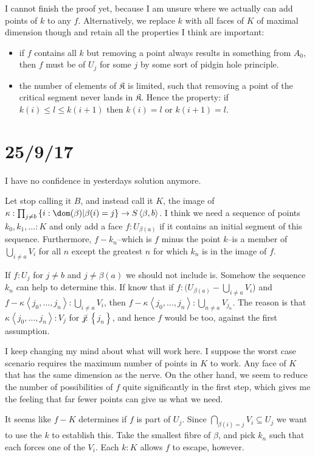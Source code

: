 \documentclass{tac}
\newcommand\set[1]{\left\{#1\right\}}
\newcommand\of{:}
\newcommand\tuplet[1]{\left\langle #1 \right\rangle}
\begin{document}
I cannot finish the proof yet, because I am unsure where we actually can add points of $k$ to any $f$. Alternatively, we replace $k$ with all faces of $K$ of maximal dimension though and retain all the properties I think are important:
\begin{itemize}
\item if $f$ contains all $k$ but removing a point always results in something from $A_0$, then $f$ must be of $U_j$ for some $j$ by some sort of pidgin hole principle.
\item the number of elements of $\mathfrak K$ is limited, such that removing a point of the critical segment never lands in $\mathfrak K$. Hence the property: if $k(i)\leq l \leq k(i+1)$ then $k(i) = l$ or $k(i+1) = l$.
\end{itemize}

\section{25/9/17}
I have no confidence in yesterdays solution anymore.

Let stop calling it $B$, and instead call it $K$, the image of $\kappa\of \prod_{j\neq b}\set{i\of\dom(\beta)|\beta(i)=j} \to S\tuplet{\beta,b}$. I think we need a sequence of points $k_0,k_1,\dots \of K$ and only add a face $f\of U_{\beta(a)}$ if it contains an initial segment of this sequence. Furthermore, $f-{k_n}$--which is $f$ minus the point $k$--is a member of $\bigcup_{i\neq a} V_i$ for all $n$ except the greatest $n$ for which $k_n$ is in the image of $f$.

If $f\of U_j$ for $j\neq b$ and $j\neq\beta(a)$ we should not include is. Somehow the sequence $k_n$ can help to determine this. 
If know that if $f\of (U_{\beta(a)} - \bigcup_{i\neq a} V_i$)
and $f - \kappa\tuplet{j_0,\dotsc,j_n}\of \bigcup_{i\neq a} V_i$,
then $f - \kappa\tuplet{j_0,\dotsc,j_n}\of \bigcup_{n\neq a} V_{j_n}$.
The reason is that $\kappa\tuplet{j_0,\dotsc,j_n}\of V_j$ for $j\not\of\set{j_n}$, and hence $f$ would be too, against the first assumption.

I keep changing my mind about what will work here. I suppose the worst case scenario requires the maximum number of points in $K$ to work. Any face of $K$ that has the same dimension as the nerve.
On the other hand, we seem to reduce the number of possibilities of $f$ quite significantly in the first step, which gives me the feeling that far fewer points can give us what we need.


It seems like $f-K$ determines if $f$ is part of $U_j$. Since $\bigcap_{\beta(i) = j} V_i \subseteq U_j$ we want to use the $k$ to establish this. Take the smallest fibre of $\beta$, and pick $k_n$ such that each forces one of the $V_i$. Each $k\of K$ allows $f$ to escape, however.
\end{document}

